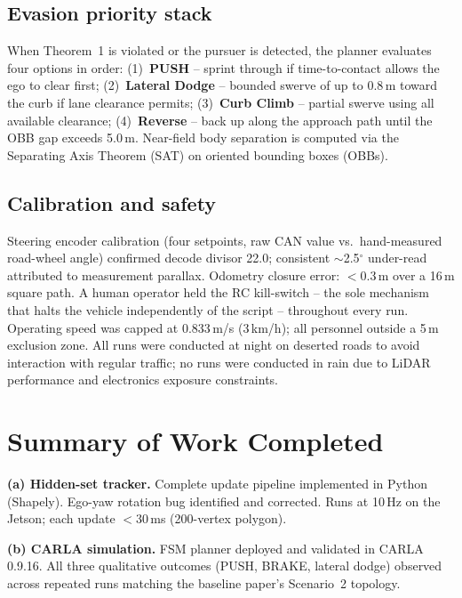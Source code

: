 \documentclass[11pt,a4paper]{article}
\begin{document}
\subsection*{Evasion priority stack}
When Theorem~1 is violated or the pursuer is detected, the planner evaluates four
options in order: (1)~\textbf{PUSH} -- sprint through if time-to-contact allows the ego
to clear first; (2)~\textbf{Lateral Dodge} -- bounded swerve of up to 0.8\,m toward the
curb if lane clearance permits; (3)~\textbf{Curb Climb} -- partial swerve using all
available clearance; (4)~\textbf{Reverse} -- back up along the approach path until the
OBB gap exceeds 5.0\,m. Near-field body separation is computed via the Separating Axis
Theorem (SAT) on oriented bounding boxes (OBBs).

\subsection*{Calibration and safety}
Steering encoder calibration (four setpoints, raw CAN value vs.\ hand-measured
road-wheel angle) confirmed decode divisor 22.0; consistent ${\sim}$2.5$^\circ$
under-read attributed to measurement parallax. Odometry closure error: $<$0.3\,m over a
16\,m square path. A human operator held the RC kill-switch -- the sole mechanism that
halts the vehicle independently of the script -- throughout every run. Operating speed
was capped at 0.833\,m/s (3\,km/h); all personnel outside a 5\,m exclusion zone. All
runs were conducted at night on deserted roads to avoid interaction with regular traffic;
no runs were conducted in rain due to LiDAR performance and electronics exposure
constraints.

\section{Summary of Work Completed}

\noindent\textbf{(a) Hidden-set tracker.} Complete update pipeline implemented in Python
(Shapely). Ego-yaw rotation bug identified and corrected. Runs at 10\,Hz on the Jetson;
each update $<$30\,ms (200-vertex polygon).

\noindent\textbf{(b) CARLA simulation.} FSM planner deployed and validated in CARLA
0.9.16. All three qualitative outcomes (PUSH, BRAKE, lateral dodge) observed across
repeated runs matching the baseline paper's Scenario~2 topology.
\end{document}
